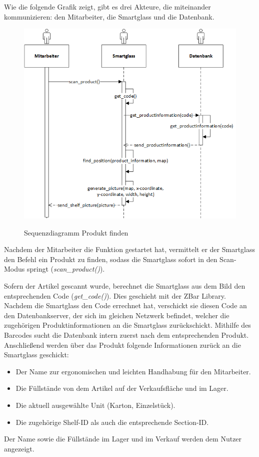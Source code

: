Wie die folgende Grafik zeigt, gibt es drei Akteure, die miteinander kommunizieren: den Mitarbeiter, die Smartglass und die Datenbank.
\begin{figure}[H]
	\centering
	{\includegraphics[scale=0.8]{Bilder/Abbildungen/SMAR_produkt_finden_Sequenzdiagramm.png}}
	\caption{Sequenzdiagramm Produkt finden}
	\label{fig:jwt_encode}
\end{figure}
Nachdem der Mitarbeiter die Funktion gestartet hat, vermittelt er der Smartglass den Befehl ein Produkt zu finden, sodass die Smartglass sofort in den Scan-Modus springt (\emph{scan\_product()}). 

Sofern der Artikel gescannt wurde, berechnet die Smartglass aus dem Bild den entsprechenden Code (\emph{get\_code()}). Dies geschieht mit der ZBar Library. Nachdem die Smartglass den Code errechnet hat, verschickt sie diesen Code an den Datenbankserver, der sich im gleichen Netzwerk befindet, welcher die zugehörigen Produktinformationen an die Smartglass zurückschickt. Mithilfe des Barcodes sucht die Datenbank intern zuerst nach dem entsprechenden Produkt. Anschließend werden über das Produkt folgende Informationen zurück an die Smartglass geschickt:
\begin{itemize}
	\item Der Name zur ergonomischen und leichten Handhabung für den Mitarbeiter.
	\item Die Füllstände von dem Artikel auf der Verkaufsfläche und im  Lager.
	\item Die aktuell ausgewählte Unit (Karton, Einzelstück).
	\item Die zugehörige Shelf-ID als auch die entsprechende Section-ID.
\end{itemize}
Der Name sowie die Füllstände im Lager und im Verkauf werden dem Nutzer angezeigt.

